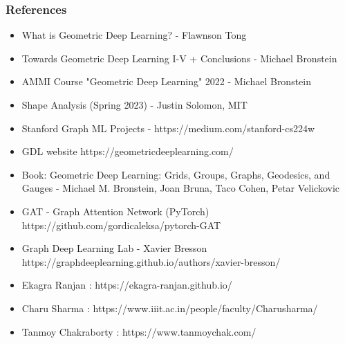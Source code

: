 \begin{frame}[fragile]\frametitle{References}

\begin{itemize}
\item What is Geometric Deep Learning? - Flawnson Tong
\item Towards Geometric Deep Learning I-V + Conclusions - Michael Bronstein
\item AMMI Course "Geometric Deep Learning" 2022 - Michael Bronstein
\item Shape Analysis (Spring 2023) -  Justin Solomon, MIT
\item Stanford Graph ML Projects - https://medium.com/stanford-cs224w
\item GDL website https://geometricdeeplearning.com/
\item Book: Geometric Deep Learning: Grids, Groups, Graphs, Geodesics, and Gauges - Michael M. Bronstein, Joan Bruna, Taco Cohen, Petar Velickovic
\item GAT - Graph Attention Network (PyTorch) https://github.com/gordicaleksa/pytorch-GAT
\item Graph Deep Learning Lab - Xavier Bresson https://graphdeeplearning.github.io/authors/xavier-bresson/
\item Ekagra Ranjan : https://ekagra-ranjan.github.io/
\item Charu Sharma : https://www.iiit.ac.in/people/faculty/Charusharma/
\item Tanmoy Chakraborty : https://www.tanmoychak.com/
\end{itemize}
	  
\end{frame}
